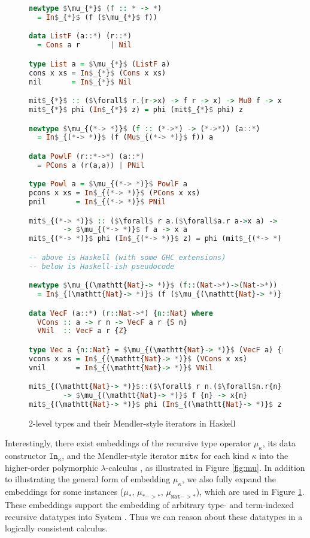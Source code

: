 \begin{figure}\vspace*{-8pt}
\begin{lstlisting}[basicstyle={\ttfamily\small},language=Haskell,mathescape]
newtype $\mu_{*}$ (f :: * -> *)
  = In$_{*}$ (f ($\mu_{*}$ f))

data ListF (a::*) (r::*)
  = Cons a r       | Nil

type List a = $\mu_{*}$ (ListF a)
cons x xs = In$_{*}$ (Cons x xs)
nil       = In$_{*}$ Nil

mit$_{*}$ :: ($\forall$ r.(r->x) -> f r -> x) -> Mu0 f -> x
mit$_{*}$ phi (In$_{*}$ z) = phi (mit$_{*}$ phi) z

newtype $\mu_{(*-> *)}$ (f :: (*->*) -> (*->*)) (a::*)
  = In$_{(*-> *)}$ (f (Mu$_{(*-> *)}$ f)) a

data PowlF (r::*->*) (a::*)
  = PCons a (r(a,a)) | PNil

type Powl a = $\mu_{(*-> *)}$ PowlF a
pcons x xs = In$_{(*-> *)}$ (PCons x xs)
pnil       = In$_{(*-> *)}$ PNil

mit$_{(*-> *)}$ :: ($\forall$ r a.($\forall$a.r a->x a) -> f r a -> x a)
        -> $\mu_{(*-> *)}$ f a -> x a
mit$_{(*-> *)}$ phi (In$_{(*-> *)}$ z) = phi (mit$_{(*-> *)}$ phi) z

-- above is Haskell (with some GHC extensions)
-- below is Haskell-ish pseudocode

newtype $\mu_{(\mathtt{Nat}-> *)}$ (f::(Nat->*)->(Nat->*)) {n::Nat}
  = In$_{(\mathtt{Nat}-> *)}$ (f ($\mu_{(\mathtt{Nat}-> *)}$ f)) {n}

data VecF (a::*) (r::Nat->*) {n::Nat} where
  VCons :: a -> r n -> VecF a r {S n}
  VNil  :: VecF a r {Z}

type Vec a {n::Nat} = $\mu_{(\mathtt{Nat}-> *)}$ (VecF a) {n}
vcons x xs = In$_{(\mathtt{Nat}-> *)}$ (VCons x xs)
vnil       = In$_{(\mathtt{Nat}-> *)}$ VNil

mit$_{(\mathtt{Nat}-> *)}$::($\forall$ r n.($\forall$n.r{n}->x{n})->f r {n}->x{n})
        -> $\mu_{(\mathtt{Nat}-> *)}$ f {n} -> x{n}
mit$_{(\mathtt{Nat}-> *)}$ phi (In$_{(\mathtt{Nat}-> *)}$ z) = phi (mit$_{(\mathtt{Nat}-> *)}$ phi) z
\end{lstlisting}
\caption{2-level types and their Mendler-style iterators in Haskell}
\label{fig:twoleveltypes}
\end{figure}

Interestingly, there exist embeddings of the recursive type operator
$\mu_\kappa$, its data constructor $\mathtt{In}_\kappa$, and
the Mendler-style iterator $\mathtt{mit}\kappa$ for each kind $\kappa$
into the higher-order polymorphic $\lambda$-calculus \Fi, as illustrated
in Figure \ref{fig:mu}. In addition to illustrating the general form of
embedding $\mu_\kappa$, we also fully expand the embeddings for some
instances ($\mu_{*}$, $\mu_{*->*}$, $\mu_{\mathtt{Nat}->*}$), which are
used in Figure \ref{fig:twoleveltypes}. These embeddings support the embedding
of arbitrary type- and term-indexed recursive datatypes into System \Fi.
Thus we can reason about these datatypes in a logically consistent calculus.

